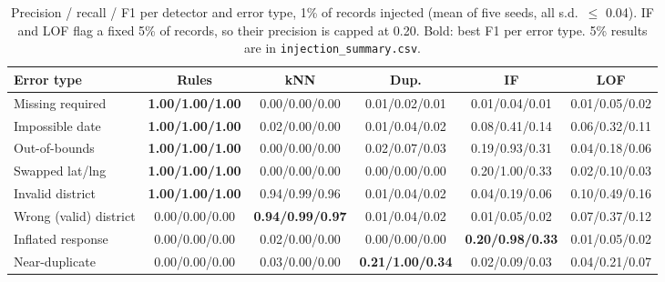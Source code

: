 \newcommand{\INFLIF}{0.98}
\newcommand{\WRONGKNN}{0.99}
\newcommand{\DUPREC}{1.00}
\begin{table}[tbp]
\centering\scriptsize
\caption{Precision / recall / F1 per detector and error type, 1\% of records injected (mean of five seeds, all s.d.\ $\le$ 0.04). IF and LOF flag a fixed 5\% of records, so their precision is capped at 0.20. Bold: best F1 per error type. 5\% results are in \texttt{injection\_summary.csv}.}
\label{tab:inj}
\setlength{\tabcolsep}{4pt}
\begin{tabular}{@{}lccccc@{}}
\toprule
Error type & Rules & kNN & Dup. & IF & LOF \\
\midrule
Missing required & \textbf{1.00/1.00/1.00} & 0.00/0.00/0.00 & 0.01/0.02/0.01 & 0.01/0.04/0.01 & 0.01/0.05/0.02 \\
Impossible date & \textbf{1.00/1.00/1.00} & 0.02/0.00/0.00 & 0.01/0.04/0.02 & 0.08/0.41/0.14 & 0.06/0.32/0.11 \\
Out-of-bounds & \textbf{1.00/1.00/1.00} & 0.00/0.00/0.00 & 0.02/0.07/0.03 & 0.19/0.93/0.31 & 0.04/0.18/0.06 \\
Swapped lat/lng & \textbf{1.00/1.00/1.00} & 0.00/0.00/0.00 & 0.00/0.00/0.00 & 0.20/1.00/0.33 & 0.02/0.10/0.03 \\
Invalid district & \textbf{1.00/1.00/1.00} & 0.94/0.99/0.96 & 0.01/0.04/0.02 & 0.04/0.19/0.06 & 0.10/0.49/0.16 \\
Wrong (valid) district & 0.00/0.00/0.00 & \textbf{0.94/0.99/0.97} & 0.01/0.04/0.02 & 0.01/0.05/0.02 & 0.07/0.37/0.12 \\
Inflated response & 0.00/0.00/0.00 & 0.02/0.00/0.00 & 0.00/0.00/0.00 & \textbf{0.20/0.98/0.33} & 0.01/0.05/0.02 \\
Near-duplicate & 0.00/0.00/0.00 & 0.03/0.00/0.00 & \textbf{0.21/1.00/0.34} & 0.02/0.09/0.03 & 0.04/0.21/0.07 \\
\bottomrule
\end{tabular}
\end{table}
